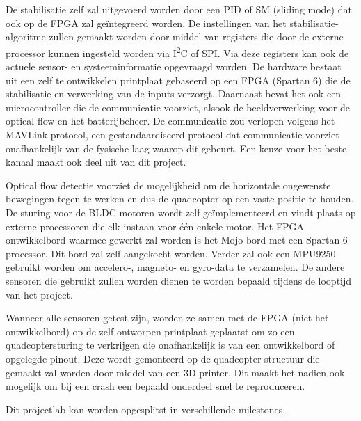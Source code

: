 		\par De stabilisatie zelf zal uitgevoerd worden door een PID of SM (sliding mode) dat ook op de FPGA zal ge\"integreerd worden. De instellingen van het stabilisatie-algoritme zullen gemaakt worden door middel van registers die door de externe processor kunnen ingesteld worden via I\textsuperscript{2}C of SPI. Via deze registers kan ook de actuele sensor- en systeeminformatie opgevraagd worden. De hardware bestaat uit een zelf te ontwikkelen printplaat gebaseerd op een FPGA (Spartan 6) die de stabilisatie en verwerking van de inputs verzorgt. Daarnaast bevat het ook een microcontroller die de communicatie voorziet, alsook de beeldverwerking voor de optical flow en het batterijbeheer. De communicatie zou verlopen volgens het MAVLink protocol, een gestandaardiseerd protocol dat communicatie voorziet onafhankelijk van de fysische laag waarop dit gebeurt. Een keuze voor het beste kanaal maakt ook deel uit van dit project. 
\newpage
		\par Optical flow detectie voorziet de  mogelijkheid om de horizontale ongewenste bewegingen tegen te werken en dus de quadcopter op een vaste positie te houden. De sturing voor de BLDC motoren wordt zelf ge\"implementeerd en vindt plaats op externe processoren die elk instaan voor \'e\'en enkele motor. Het FPGA ontwikkelbord waarmee gewerkt zal worden is het Mojo bord met een Spartan 6 processor. Dit bord zal zelf aangekocht worden. Verder zal ook een MPU9250 gebruikt worden om accelero-, magneto- en gyro-data te verzamelen. De andere sensoren die gebruikt zullen worden dienen te worden bepaald tijdens de looptijd van het project. 

		\par Wanneer alle sensoren getest zijn, worden ze samen met de FPGA (niet het ontwikkelbord) op de zelf ontworpen printplaat geplaatst om zo een quadcoptersturing te verkrijgen die onafhankelijk is van een ontwikkelbord of opgelegde pinout. Deze wordt gemonteerd op de quadcopter structuur die gemaakt zal worden door middel van een 3D printer. Dit maakt het nadien ook mogelijk om bij een crash een bepaald onderdeel snel te reproduceren.

		\par Dit projectlab kan worden opgesplitst in verschillende milestones.
			

